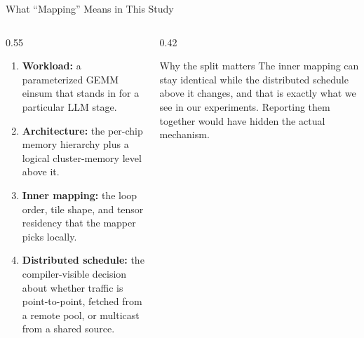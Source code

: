 \documentclass[10pt,aspectratio=169]{beamer}
\newenvironment{tightenumerate}{\begin{enumerate}\setlength{\itemsep}{4pt}\setlength{\parskip}{0pt}}{\end{enumerate}}
\begin{document}
\begin{frame}{What ``Mapping'' Means in This Study}
  \begin{columns}[T,onlytextwidth]
    \begin{column}{0.55\textwidth}
      \begin{tightenumerate}
        \item \textbf{Workload:} a parameterized GEMM einsum that stands in for a particular LLM stage.
        \item \textbf{Architecture:} the per-chip memory hierarchy plus a logical cluster-memory level above it.
        \item \textbf{Inner mapping:} the loop order, tile shape, and tensor residency that the mapper picks locally.
        \item \textbf{Distributed schedule:} the compiler-visible decision about whether traffic is point-to-point, fetched from a remote pool, or multicast from a shared source.
      \end{tightenumerate}
    \end{column}
    \begin{column}{0.42\textwidth}
      \begin{block}{Why the split matters}
      The inner mapping can stay identical while the distributed schedule above it changes, and that is exactly what we see in our experiments. Reporting them together would have hidden the actual mechanism.
      \end{block}
    \end{column}
  \end{columns}
\end{frame}
\end{document}
